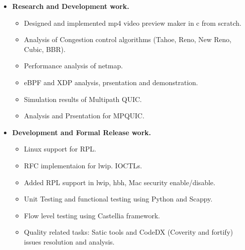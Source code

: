 \begin{itemize}
	\item \textbf{Research and Development work.}
	\begin{itemize}  	
		\item Designed and implemented mp4 video preview maker in c from scratch.
		\item Analysis of Congestion control algorithms (Tahoe, Reno, New Reno, Cubic, BBR).
		\item Performance analysis of netmap.
		\item eBPF and XDP analysis, prsentation and demonstration. 
		\item Simulation results of Multipath QUIC.
		\item Analysis and Prsentation for MPQUIC.
	\end{itemize}
	\item \textbf{Development and Formal Release work.}
	\begin{itemize} 
	 \item Linux support for RPL.
	 \item RFC implementaion for lwip. IOCTLs.
	 \item Added RPL support in lwip, hbh, Mac security enable/disable.
	 \item Unit Testing and functional testing using Python and Scappy.
	 \item Flow level testing using Castellia framework. 
	 \item Quality related tasks: Satic tools and CodeDX (Coverity and fortify) issues resolution and analysis.
	\end{itemize}


\end{itemize}
